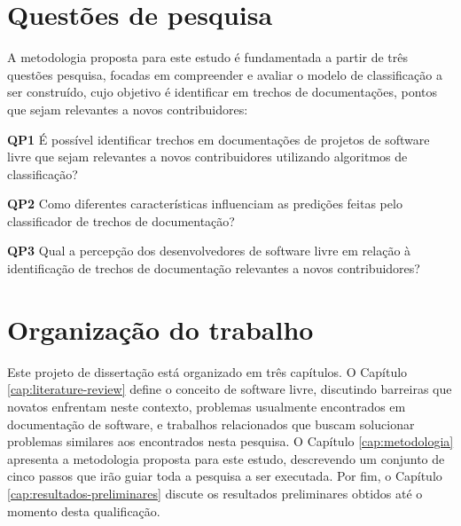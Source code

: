 \section{Questões de pesquisa}
\label{sec:questoes-de-pesquisa}
A metodologia proposta para este estudo é fundamentada a partir de três questões pesquisa, focadas em compreender e avaliar o modelo de classificação a ser construído, cujo objetivo é identificar em trechos de documentações, pontos que sejam relevantes a novos contribuidores:

\textbf{QP1} É possível identificar trechos em documentações de projetos de software livre que sejam relevantes a novos contribuidores utilizando algoritmos de classificação?

\textbf{QP2} Como diferentes características influenciam  as predições feitas pelo classificador de trechos de documentação?

\textbf{QP3} Qual a percepção dos desenvolvedores de software livre em relação à identificação de trechos de documentação relevantes a novos contribuidores?

\section{Organização do trabalho}
Este projeto de dissertação está organizado em três capítulos. O Capítulo \ref{cap:literature-review} define o conceito de software livre, discutindo barreiras que novatos enfrentam neste contexto, problemas usualmente encontrados em documentação de software, e trabalhos relacionados que buscam solucionar problemas similares aos encontrados nesta pesquisa. O Capítulo \ref{cap:metodologia} apresenta a metodologia proposta para este estudo, descrevendo um conjunto de cinco passos que irão guiar toda a pesquisa a ser executada. Por fim, o Capítulo \ref{cap:resultados-preliminares} discute os resultados preliminares obtidos até o momento desta qualificação.